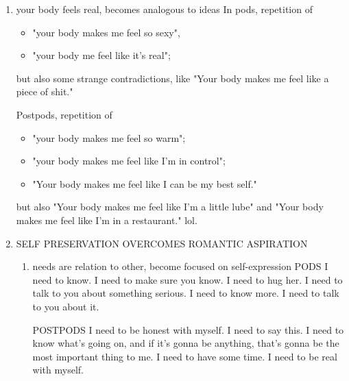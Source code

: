 \documentclass[11pt]{article}
\begin{document}
\begin{enumerate}
\begin{enumerate}
POSTPODS
\begin{itemize}
\item I don't want to kiss you (repeated frequently).
\end{itemize}

\item your body feels real, becomes analogous to ideas
\label{sec:org805de54}
In pods, repetition of
\begin{itemize}
\item "your body makes me feel so sexy",
\item "your body me feel like it's real";
\end{itemize}

but also some strange contradictions, like "Your body makes me feel
like a piece of shit."

Postpods, repetition of
\begin{itemize}
\item "your body makes me feel so warm";
\item "your body makes me feel like I'm in control";
\item "Your body makes me feel like I can be my best self."
\end{itemize}

but also "Your body makes me feel like I'm a little lube" and "Your
body makes me feel like I'm in a restaurant." lol.

\item SELF PRESERVATION OVERCOMES ROMANTIC ASPIRATION
\label{sec:org0895574}
\begin{enumerate}
\item needs are relation to other, become focused on self-expression
\label{sec:org068a084}
PODS
I need to know.
I need to make sure you know.
I need to hug her.
I need to talk to you about something serious.
I need to know more.
I need to talk to you about it.

POSTPODS
I need to be honest with myself.
I need to say this.
I need to know what's going on, and if it's gonna be anything, that's gonna be the most important thing to me.
I need to have some time.
I need to be real with myself.


\end{enumerate}
\end{enumerate}
\end{enumerate}
\end{document}
